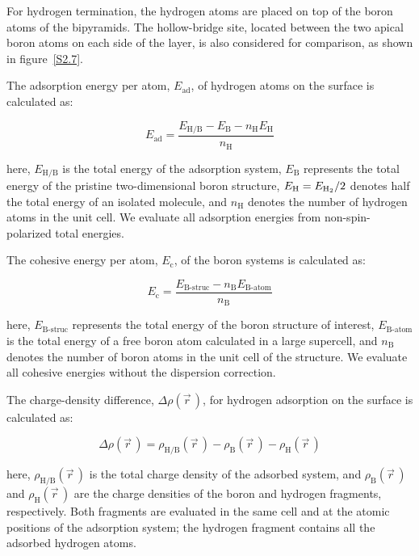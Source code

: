 For hydrogen termination,
the hydrogen atoms are placed on top of the boron atoms of the bipyramids.
The hollow-bridge site,
located between the two apical boron atoms on each side of the layer,
is also considered for comparison,
as shown in figure~\ref{S2.7}.

The adsorption energy per atom, $E_{\mathrm{ad}}$, of hydrogen atoms on the surface is calculated as:

\begin{equation}
    E_{\mathrm{ad}} = \frac{E_{\mathrm{H/B}} - E_{\mathrm{B}} - n_{\mathrm{H}}E_{\mathrm{H}}}{n_{\mathrm{H}}}
\label{hydrogen_adsorption_energy}
\end{equation}

here, $E_{\mathrm{H/B}}$ is the total energy of the adsorption system,
$E_{\mathrm{B}}$ represents the total energy of the pristine two-dimensional boron structure,
$E_{\mathrm{H}}=E_{\ce{H2}}/2$ denotes half the total energy of an isolated  molecule,
and $n_{\mathrm{H}}$ denotes the number of hydrogen atoms in the unit cell.
We evaluate all adsorption energies from non-spin-polarized total energies.

The cohesive energy per atom, $E_{\mathrm{c}}$, of the boron systems is calculated as:

\begin{equation}
    E_{\mathrm{c}}
    = \frac{E_{\mathrm{B\text{-}struc}} - n_{\mathrm{B}}E_{\mathrm{B\text{-}atom}}}{n_{\mathrm{B}}}
\label{cohesive_energy_per_atom}
\end{equation}

here,
$E_{\mathrm{B\text{-}struc}}$ represents the total energy of the boron structure of interest,
$E_{\mathrm{B\text{-}atom}}$ is the total energy of a free boron atom calculated in a large supercell,
and $n_{\mathrm{B}}$ denotes the number of boron atoms in the unit cell of the structure.
We evaluate all cohesive energies without the dispersion correction.

The charge-density difference, $\Delta \rho(\vec{r}\,)$, for hydrogen adsorption on the surface is calculated as:

\begin{equation}
    \Delta \rho(\vec{r}\,) =
    \rho_{\mathrm{H/B}}(\vec{r}\,)
    - \rho_{\mathrm{B}}(\vec{r}\,)
    - \rho_{\mathrm{H}}(\vec{r}\,)
\label{charge_density_difference_hydrogen_adsorption}
\end{equation}

here, $\rho_{\mathrm{H/B}}(\vec{r}\,)$ is the total charge density of the adsorbed system,
and $\rho_{\mathrm{B}}(\vec{r}\,)$ and $\rho_{\mathrm{H}}(\vec{r}\,)$ are the charge densities of the boron and hydrogen fragments,
respectively.
Both fragments are evaluated in the same cell and at the atomic positions of the adsorption system;
the hydrogen fragment contains all the adsorbed hydrogen atoms.

